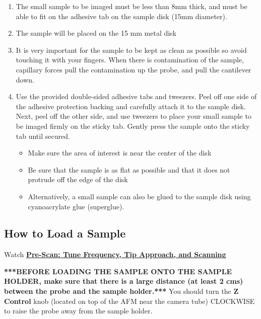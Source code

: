 \documentclass{../lab}
\begin{document}
\begin{enumerate}
    \item The small sample to be imaged must be less than 8mm thick, and must be able to fit on the adhesive tab on the sample disk (15mm diameter).

    \item The sample will be placed on the 15 mm metal disk

    \item It is very important for the sample to be kept as clean as possible so avoid touching it with your fingers.  When there is contamination of the sample, capillary forces pull the contamination up the probe, and pull the cantilever down.

    \item Use the provided double-sided adhesive tabs and tweezers.  Peel off one side of the adhesive protection backing and carefully attach it to the sample disk.  Next, peel off the other side, and use tweezers to place your small sample to be imaged firmly on the sticky tab.  Gently press the sample onto the sticky tab until secured.

    \begin{itemize}
        \item Make sure the area of interest is near the center of the disk

        \item Be sure that the sample is as flat as possible and that it does not protrude off the edge of the disk

        \item Alternatively, a small sample can also be glued to the sample disk using cyanoacrylate glue (superglue).
    \end{itemize}

\end{enumerate}

\subsection{How to Load a Sample}
\label{subsec:HowToLoadASample}

Watch \href{http://experimentationlab.berkeley.edu/sites/default/files/prescan\_final\_0.mp4}{\textbf{Pre-Scan: Tune Frequency, Tip Approach, and Scanning}}

\textbf{***BEFORE LOADING THE SAMPLE ONTO THE SAMPLE HOLDER, make sure that there is a large distance (at least 2 cms) between the probe and the sample holder.***}  You should turn the \textbf{Z Control} knob (located on top of the AFM near the camera tube) CLOCKWISE to raise the probe away from the sample holder.
\end{document}
